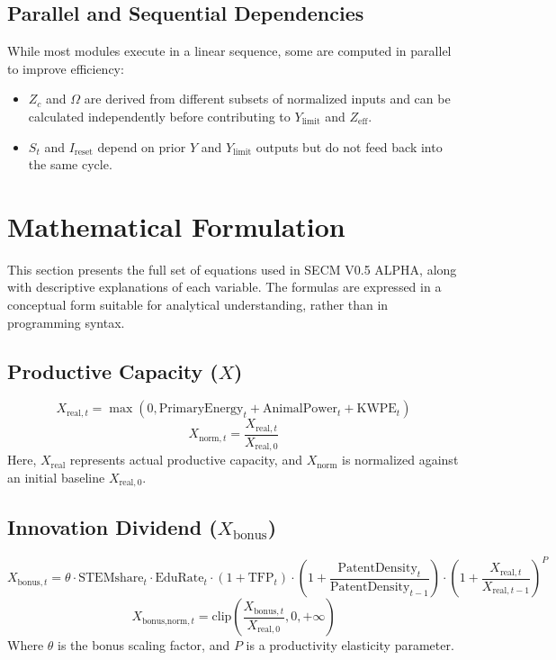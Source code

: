 \documentclass[12pt,a4paper]{article}
\begin{document}
\subsection{Parallel and Sequential Dependencies}
While most modules execute in a linear sequence, some are computed in parallel to improve efficiency:
\begin{itemize}
    \item \(Z_c\) and \(\Omega\) are derived from different subsets of normalized inputs and can be calculated independently before contributing to \(Y_{\mathrm{limit}}\) and \(Z_{\mathrm{eff}}\).
    \item \(S_t\) and \(I_{\mathrm{reset}}\) depend on prior \(Y\) and \(Y_{\mathrm{limit}}\) outputs but do not feed back into the same cycle.
\end{itemize}
\section{Mathematical Formulation}

This section presents the full set of equations used in SECM V0.5 ALPHA, along with descriptive explanations of each variable. The formulas are expressed in a conceptual form suitable for analytical understanding, rather than in programming syntax.

\subsection{Productive Capacity ($X$)}
\begin{equation}
X_{\text{real},t} = \max\left(0, \text{PrimaryEnergy}_t + \text{AnimalPower}_t + \text{KWPE}_t \right)
\end{equation}
\begin{equation}
X_{\text{norm},t} = \frac{X_{\text{real},t}}{X_{\text{real},0}}
\end{equation}
Here, \(X_{\text{real}}\) represents actual productive capacity, and \(X_{\text{norm}}\) is normalized against an initial baseline \(X_{\text{real},0}\).

\subsection{Innovation Dividend ($X_{\text{bonus}}$)}
\begin{equation}
X_{\text{bonus},t} = \theta \cdot \text{STEMshare}_t \cdot \text{EduRate}_t \cdot (1 + \text{TFP}_t) \cdot \left( 1 + \frac{\text{PatentDensity}_t}{\text{PatentDensity}_{t-1}} \right) \cdot \left( 1 + \frac{X_{\text{real},t}}{X_{\text{real},t-1}} \right)^{P}
\end{equation}
\begin{equation}
X_{\text{bonus,norm},t} = \mathrm{clip}\left( \frac{X_{\text{bonus},t}}{X_{\text{real},0}}, 0, +\infty \right)
\end{equation}
Where $\theta$ is the bonus scaling factor, and $P$ is a productivity elasticity parameter.
\end{document}
